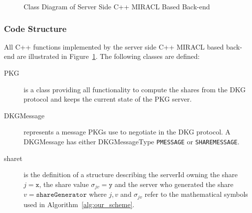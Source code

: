 \begin{figure}
{{

    }}
    \caption{Class Diagram of Server Side C++ MIRACL Based Back-end}
    \label{fig:class_server_side}
\end{figure}

\subsubsection{Code Structure}
All C++ functions implemented by the server side C++ MIRACL based back-end are illustrated in Figure~\ref{fig:class_server_side}. The following classes are defined:
\begin{description}
 \item[PKG] is a class providing all functionality to compute the shares from the DKG protocol and keeps the current state of the PKG server.
 \item[DKGMessage] represents a message PKGs use to negotiate in the DKG protocol. A DKGMessage has either DKGMessageType \texttt{P\textunderscore MESSAGE} or \texttt{SHARE\textunderscore MESSAGE}. 
 \item[share\textunderscore t] is the definition of a structure describing the serverId owning the share $j = \mathtt{x}$, the share value $\sigma_{jv} = \mathtt{y}$ and the server who generated the share $v = \mathtt{shareGenerator}$ where $j,v$ and $\sigma_{jv}$ refer to the mathematical symbols used in Algorithm~\ref{alg:our_scheme}.
\end{description}

